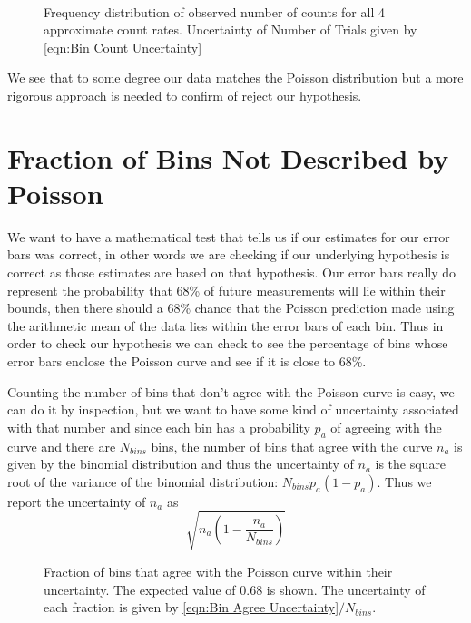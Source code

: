 \documentclass[12pt]{article}
\numberwithin{equation}{section}
\numberwithin{figure}{section}
\numberwithin{table}{section}
\begin{document}
\begin{figure}[H]%
    \centering
    \,
    \,
    \,
    \caption{Frequency distribution of observed number of counts for all 4 approximate count rates. Uncertainty of Number of Trials given by \autoref{eqn:Bin Count Uncertainty}}
    \label{fig:Poisson Plots}
\end{figure}
\par We see that to some degree our data matches the Poisson distribution but a more rigorous approach is needed to confirm of reject our hypothesis. 

\section{Fraction of Bins Not Described by Poisson}\label{sec:Poisson Bins}
We want to have a mathematical test that tells us if our estimates for our error bars was correct, in other words we are checking if our underlying hypothesis is correct as those estimates are based on that hypothesis. Our error bars really do represent the probability that 68\% of future measurements will lie within their bounds, then there should a 68\% chance that the Poisson prediction made using the arithmetic mean of the data lies within the error bars of each bin. Thus in order to check our hypothesis we can check to see the percentage of bins whose error bars enclose the Poisson curve and see if it is close to 68\%. 
\par Counting the number of bins that don't agree with the Poisson curve is easy, we can do it by inspection, but we want to have some kind of uncertainty associated with that number and since each bin has a probability $p_a$ of agreeing with the curve and there are $N_{bins}$ bins, the number of bins that agree with the curve $n_a$ is given by the binomial distribution and thus the uncertainty of $n_a$ is the square root of the variance of the binomial distribution: $N_{bins}p_a(1-p_a)$. Thus we report the uncertainty of $n_a$ as 
\begin{equation}
    \sqrt{n_a\left(1-\frac{n_a}{N_{bins}}\right)}
    \label{eqn:Bin Agree Uncertainty}
\end{equation}

\begin{figure}[H]
    \begin{center}
       \caption{Fraction of bins that agree with the Poisson curve within their uncertainty. The expected value of 0.68 is shown. The uncertainty of each fraction is given by \autoref{eqn:Bin Agree Uncertainty}$/N_{bins}$.}
       \label{fig:Bin Agree}
    \end{center}
\end{figure}
\end{document}
